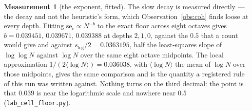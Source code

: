 \documentclass[11pt,a4paper]{article}
\theoremstyle{plain}
\theoremstyle{definition}
\newtheorem{measurement}[theorem]{Measurement}
\theoremstyle{remark}
\begin{document}
\begin{measurement}[the exponent, fitted]\label{meas:exponent}
The slow decay is measured directly --- the decay and not the
heuristic's form, which Observation~\ref{obs:coh} finds loose at every
depth. Fitting $\mathrm{se}_c\propto N^{-b}$ to
the exact floor across eight octaves gives
$b=0.039451,\,0.039671,\,0.039388$ at depths $2,1,0$, against the
$0.5$ that a count would give and against $s_{\log}/2=0.0363195$, half
the least-squares slope of $\log\log N$ against $\log N$ over the same
eight octave midpoints. The local approximation
$1/(2\langle\log N\rangle)=0.036038$, with $\langle\log N\rangle$ the
mean of $\log N$ over those midpoints, gives the same comparison and is
the quantity a registered rule of this run was written against.
Nothing turns on the third decimal: the point is that $0.039$ is near
the logarithmic scale and nowhere near $0.5$
(\texttt{lab\_cell\_floor.py}).
\end{measurement}
\end{document}
